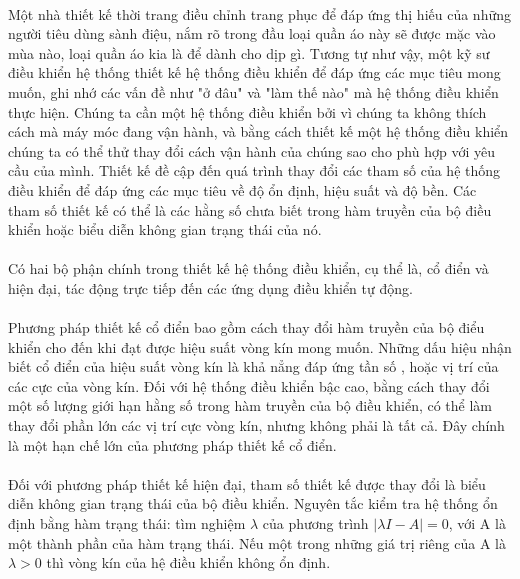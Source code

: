 \paragraph{}Một nhà thiết kế thời trang điều chỉnh trang phục để đáp ứng thị hiếu của những người tiêu dùng sành điệu, nắm rõ trong đầu loại quần áo này sẽ được mặc vào mùa nào, loại quần áo kia là để dành cho dịp gì. Tương tự như vậy, một kỹ sư điều khiển hệ thống thiết kế hệ thống điều khiển để đáp ứng các mục tiêu mong muốn, ghi nhớ các vấn đề như "ở đâu" và "làm thế nào" mà hệ thống điều khiển thực hiện. Chúng ta cần một hệ thống điều khiển bởi vì chúng ta không thích cách mà máy móc đang vận hành, và bằng cách thiết kế một hệ thống điều khiển chúng ta có thể thử thay đổi cách vận hành của chúng sao cho phù hợp với yêu cầu của mình. Thiết kế đề cập đến quá trình thay đổi các tham số của hệ thống điều khiển để đáp ứng các mục tiêu về độ ổn định, hiệu suất và độ bền. Các tham số thiết kế có thể là các hằng số chưa biết trong hàm truyền của bộ điều khiển hoặc biểu diễn không gian trạng thái của nó. 
\paragraph{}Có hai bộ phận chính trong thiết kế hệ thống điều khiển, cụ thể là, cổ điển và hiện đại, tác động trực tiếp đến các ứng dụng điều khiển tự động. 
\paragraph{}Phương pháp thiết kế cổ điển bao gồm cách thay đổi hàm truyền của bộ điểu khiển cho đến khi đạt được hiệu suất vòng kín mong muốn. Những dấu hiệu nhận biết cổ điển của hiệu suất vòng kín là khả nẳng đáp ứng tần số , hoặc vị trí của các cực của vòng kín. Đối với hệ thống điều khiển bậc cao, bằng cách thay đổi một số lượng giới hạn hằng số trong hàm truyền của bộ điều khiển, có thể làm thay đổi phần lớn các vị trí cực vòng kín, nhưng không phải là tất cả. Đây chính là một hạn chế lớn của phương pháp thiết kế cổ điển. 
\paragraph{}Đối với phương pháp thiết kế hiện đại, tham số thiết kế được thay đổi là biểu diễn không gian trạng thái của bộ điều khiển. Nguyên tắc kiểm tra hệ thống ổn định bằng hàm trạng thái: tìm nghiệm $\lambda$ của phương trình $\left|\lambda I - A\right| = 0$, với A là một thành phần của hàm trạng thái. Nếu một trong những giá trị riêng của A là $\lambda > 0$ thì vòng kín  của hệ điều khiển không ổn định.
